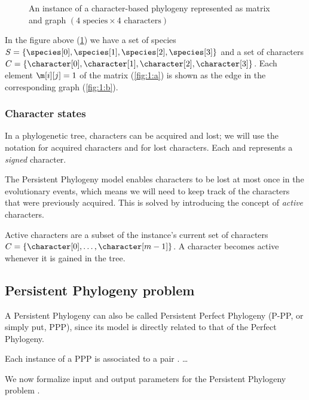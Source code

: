 \begin{figure}[h]
  

  \caption{An instance of a character-based phylogeny represented as matrix and graph $(\text{4 species} \times \text{4 characters})$}
  \label{fig:1}
\end{figure}

In the figure above (\ref{fig:1}) we have a set of species $S = \{ \species[0], \species[1], \species[2], \species[3] \}$ and a set of characters $C = \{ \character[0], \character[1], \character[2], \character[3] \}$.
Each element $\m[i][j] = 1$ of the matrix (\ref{fig:1:a}) is shown as the edge \edge{\species[i]}{\character[j]} in the corresponding graph (\ref{fig:1:b}).

\subsubsection{Character states}\label{sssec:charstates}


In a phylogenetic tree, characters can be acquired and lost; we will use the notation \character[][+] for acquired characters and \character[][-] for lost characters. Each \character[][+] and \character[][-] represents a \emph{signed} character.

The Persistent Phylogeny model enables characters to be lost at most once in the evolutionary events,  which means we will need to keep track of the characters that were previously acquired. This is solved by introducing the concept of \emph{active} characters.

Active characters are a subset of the instance's current set of characters $C = \{ \character[0], \dots, \character[m-1] \}$.
A character becomes active whenever it is gained in the tree.

\subsection{Persistent Phylogeny problem}\label{ssec:ppp}


A Persistent Phylogeny can also be called Persistent Perfect Phylogeny (P-PP, or simply put, PPP), since its model is directly related to that of the Perfect Phylogeny.

Each instance of a PPP is associated to a pair \ma{}. \dots

We now formalize input and output parameters for the Persistent Phylogeny problem \cite{Bonizzoni2016SolvingTP}.

